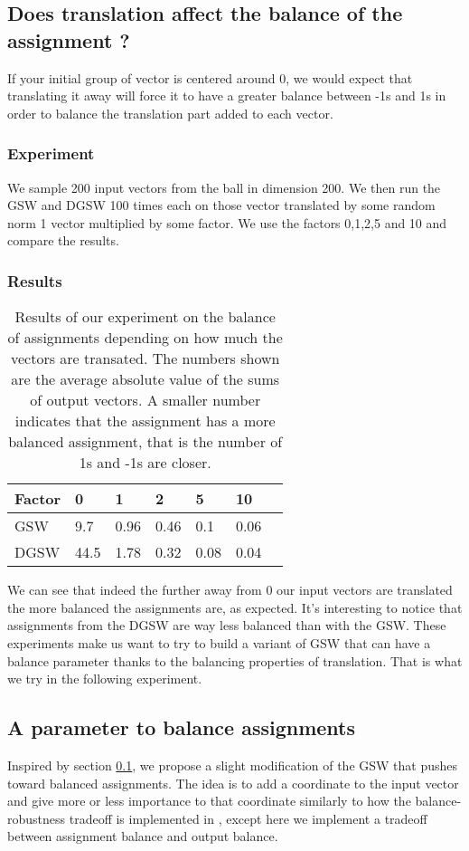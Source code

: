 \documentclass[12pt]{article}
\begin{document}
\subsection{Does translation affect the balance of the assignment ?}\label{trans_balance}
If your initial group of vector is centered around 0, we would expect that translating it away will force it to have a greater balance between -1s and 1s in order to balance the translation part added to each vector.

\subsubsection{Experiment}
We sample 200 input vectors from the ball in dimension 200. We then run the GSW and DGSW 100 times each on those vector translated by some random norm 1 vector multiplied by some factor. We use the factors 0,1,2,5 and 10 and compare the results.

\subsubsection{Results}
\begin{center}
\begin{table}[h]
\begin{tabular}{l|llllll}
 Factor & 0 & 1  & 2 & 5 & 10  \\
\hline
GSW  & 9.7 & 0.96 & 0.46 & 0.1 & 0.06 \\
DGSW & 44.5 & 1.78 & 0.32 & 0.08 & 0.04
\end{tabular}
\caption{Results of our experiment on the balance of assignments depending on how much the vectors are transated. The numbers shown are the average absolute value of the sums of output vectors. A smaller number indicates that the assignment has a more balanced assignment, that is the number of 1s and -1s are closer.}
\label{balance_when_translated}
\end{table}
\end{center}
We can see that indeed the further away from 0 our input vectors are translated the more balanced the assignments are, as expected. It's interesting to notice that assignments from the DGSW are way less balanced than with the GSW. These experiments make us want to try to build a variant of GSW that can have a balance parameter thanks to the balancing properties of translation. That is what we try in the following experiment.

\subsection{A parameter to balance assignments}\label{balance_parameter}
Inspired by section \ref{trans_balance}, we propose a slight modification of the GSW that pushes toward balanced assignments. The idea is to add a coordinate to the input vector and give more or less importance to that coordinate similarly to how the balance-robustness tradeoff is implemented in \cite{harshaw2019balancing}, except here we implement a tradeoff between assignment balance and output balance.
\end{document}
